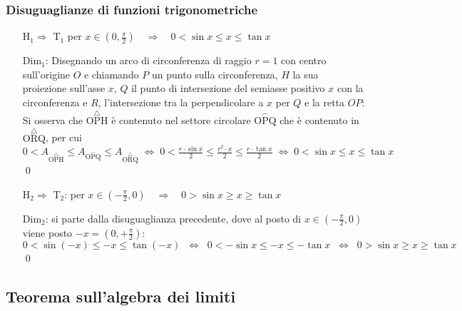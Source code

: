\documentclass[a4paper]{article}
\begin{document}
\subsubsection*{Disuguaglianze di funzioni trigonometriche}
\begin{itemize}
	\item[H\(_1 \Rightarrow\) T\(_1\)] per \(x \in \left( 0, \displaystyle \frac{\pi}{2} \right) \quad \Rightarrow \quad 0 < \sin x \leq x \leq \tan x\)
	\item[Dim\(_1\):] Disegnando un arco di circonferenza di raggio \(r = 1\) con centro sull'origine \(O\) e chiamando \(P\) un punto sulla circonferenza, \(H\) la sua proiezione sull'asse \(x\),
	\(Q\) il punto di intersezione del semiasse positivo \(x\) con la circonferenza e \(R\), l'intersezione tra la perpendicolare a \(x\) per \(Q\) e la retta \(OP\): \\
	Si osserva che \(\overset{\triangle}{\text{OPH}}\) è contenuto nel settore circolare \(\overset{\smallfrown}{\text{OPQ}}\) che è contenuto in \(\overset{\triangle}{\text{ORQ}}\), per cui \\
	\(\displaystyle 0 < A_{\overset{\triangle}{\text{OPH}}} \leq A_{\overset{\smallfrown}{\text{OPQ}}} \leq A_{\overset{\triangle}{\text{ORQ}}} \; \Leftrightarrow \;
	0 < \frac{r \cdot \sin x}{2} \leq \frac{r ^ 2 \cdot x }{2} \leq \frac{r \cdot \tan x}{2} \; \Leftrightarrow \; 0 < \sin x \leq x \leq \tan x \) \qed
	
	\item[H\(_2 \Rightarrow\) T\(_2\):] per \(x \in \left( \displaystyle - \frac{\pi}{2}, 0 \right) \quad \Rightarrow \quad 0 > \sin x \geq x \geq \tan x\)
	\item[Dim\(_2\):] si parte dalla disuguaglianza precedente, dove al posto di \(x \in \left( \displaystyle - \frac{\pi}{2}, 0 \right)\) viene posto \(-x = \left( 0, \displaystyle + \frac{\pi}{2} \right)\): \\
	\(0 < \sin \left( -x \right) \leq -x \leq \tan \left( -x \right) \;\; \Leftrightarrow \;\; 0 < -\sin x \leq -x \leq -\tan x \;\; \Leftrightarrow \;\; 0 > \sin x \geq x \geq \tan x\) \qed
\end{itemize}

\newpage


\subsection{Teorema sull'algebra dei limiti}
\end{document}
